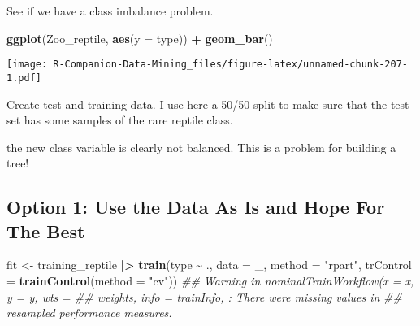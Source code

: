 \documentclass[
  notitlepage]{book}
\newenvironment{Shaded}{\begin{snugshade}}{\end{snugshade}}
\newcommand{\CommentTok}[1]{\textcolor[rgb]{0.56,0.35,0.01}{\textit{#1}}}
\newcommand{\DataTypeTok}[1]{\textcolor[rgb]{0.13,0.29,0.53}{#1}}
\newcommand{\DecValTok}[1]{\textcolor[rgb]{0.00,0.00,0.81}{#1}}
\newcommand{\ErrorTok}[1]{\textcolor[rgb]{0.64,0.00,0.00}{\textbf{#1}}}
\newcommand{\FloatTok}[1]{\textcolor[rgb]{0.00,0.00,0.81}{#1}}
\newcommand{\KeywordTok}[1]{\textcolor[rgb]{0.13,0.29,0.53}{\textbf{#1}}}
\newcommand{\NormalTok}[1]{#1}
\newcommand{\OperatorTok}[1]{\textcolor[rgb]{0.81,0.36,0.00}{\textbf{#1}}}
\newcommand{\StringTok}[1]{\textcolor[rgb]{0.31,0.60,0.02}{#1}}
\begin{document}
See if we have a class imbalance problem.

\begin{Shaded}
\begin{Highlighting}[]
\KeywordTok{ggplot}\NormalTok{(Zoo\_reptile, }\KeywordTok{aes}\NormalTok{(}\DataTypeTok{y =}\NormalTok{ type)) }\OperatorTok{+}\StringTok{ }\KeywordTok{geom\_bar}\NormalTok{()}
\end{Highlighting}
\end{Shaded}

\texttt{[image: R-Companion-Data-Mining\_files/figure-latex/unnamed-chunk-207-1.pdf]}

Create test and training data. I use here a 50/50 split to make sure
that the test set has some samples of the rare reptile class.

\begin{Shaded}
\end{Shaded}

the new class variable is clearly not balanced. This is a problem for
building a tree!

\hypertarget{option-1-use-the-data-as-is-and-hope-for-the-best}{%
\subsection{Option 1: Use the Data As Is and Hope For The Best}\label{option-1-use-the-data-as-is-and-hope-for-the-best}}

\begin{Shaded}
\begin{Highlighting}[]
\NormalTok{fit \textless{}{-}}\StringTok{ }\NormalTok{training\_reptile }\OperatorTok{|}\ErrorTok{\textgreater{}}\StringTok{ }
\StringTok{  }\KeywordTok{train}\NormalTok{(type }\OperatorTok{\textasciitilde{}}\StringTok{ }\NormalTok{.,}
        \DataTypeTok{data =}\NormalTok{ \_,}
        \DataTypeTok{method =} \StringTok{"rpart"}\NormalTok{,}
        \DataTypeTok{trControl =} \KeywordTok{trainControl}\NormalTok{(}\DataTypeTok{method =} \StringTok{"cv"}\NormalTok{))}
\CommentTok{\#\# Warning in nominalTrainWorkflow(x = x, y = y, wts =}
\CommentTok{\#\# weights, info = trainInfo, : There were missing values in}
\CommentTok{\#\# resampled performance measures.}
\end{Highlighting}
\end{Shaded}
\end{document}
